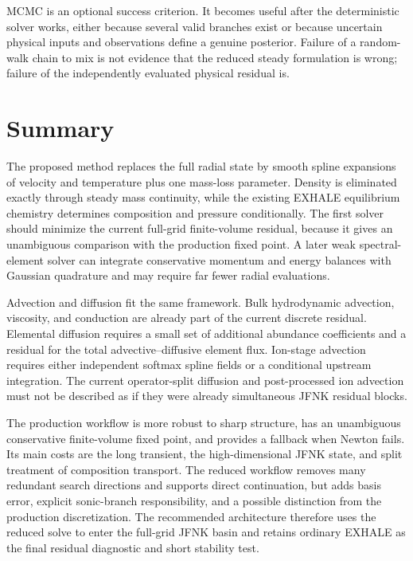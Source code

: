 \documentclass[english,a4paper]{my_memo}
\begin{document}
MCMC is an optional success criterion.  It becomes useful after the deterministic
solver works, either because several valid branches exist or because uncertain
physical inputs and observations define a genuine posterior.  Failure of a
random-walk chain to mix is not evidence that the reduced steady formulation is
wrong; failure of the independently evaluated physical residual is.

\section{Summary}\label{sec:summary}

The proposed method replaces the full radial state by smooth spline expansions
of velocity and temperature plus one mass-loss parameter.  Density is eliminated
exactly through steady mass continuity, while the existing EXHALE equilibrium
chemistry determines composition and pressure conditionally.  The first solver
should minimize the current full-grid finite-volume residual, because it gives
an unambiguous comparison with the production fixed point.  A later weak
spectral-element solver can integrate conservative momentum and energy balances
with Gaussian quadrature and may require far fewer radial evaluations.

Advection and diffusion fit the same framework.  Bulk hydrodynamic advection,
viscosity, and conduction are already part of the current discrete residual.
Elemental diffusion requires a small set of additional abundance coefficients
and a residual for the total advective--diffusive element flux.  Ion-stage
advection requires either independent softmax spline fields or a conditional
upstream integration.  The current operator-split diffusion and post-processed
ion advection must not be described as if they were already simultaneous JFNK
residual blocks.

The production workflow is more robust to sharp structure, has an unambiguous
conservative finite-volume fixed point, and provides a fallback when Newton
fails.  Its main costs are the long transient, the high-dimensional JFNK state,
and split treatment of composition transport.  The reduced workflow removes
many redundant search directions and supports direct continuation, but adds
basis error, explicit sonic-branch responsibility, and a possible distinction
from the production discretization.  The recommended architecture therefore
uses the reduced solve to enter the full-grid JFNK basin and retains ordinary
EXHALE as the final residual diagnostic and short stability test.
\end{document}
